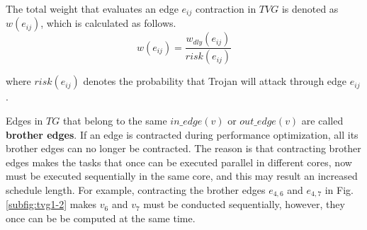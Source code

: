 \documentclass[10pt,journal]{IEEEtran}
\begin{document}
The total weight that evaluates an edge $e_{ij}$ contraction in $TVG$ is denoted as $w(e_{ij})$, which is calculated as follows.
\begin{equation}
w(e_{ij}) = \frac{w_{dly}(e_{ij})}{risk(e_{ij})}
\label{equ:weight_e}
\end{equation}

\noindent where $risk(e_{ij})$ denotes the probability that Trojan will attack through edge $e_{ij}$.

Edges in $TG$ that belong to the same $in\_edge(v)$ or $out\_edge(v)$ are called \textbf{brother edges}. If an edge is contracted during performance optimization, all its brother edges can no longer be contracted. The reason is that contracting brother edges makes the tasks that once can be executed parallel in different cores, now must be executed sequentially in the same core, and this may result an increased schedule length. For example, contracting the brother edges $e_{4,6}$ and $e_{4,7}$ in Fig. \ref{subfig:tvg1-2} makes $v_6$ and $v_7$ must be conducted sequentially, however, they once can be be computed at the same time.
\end{document}

